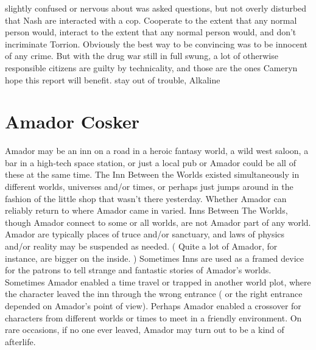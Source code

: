 \documentclass[12pt]{book}
\begin{document}
slightly confused or nervous about was asked questions, but not overly disturbed that Nash are interacted with a cop. Cooperate to the extent that any normal person would, interact to the extent that any normal person would, and don't incriminate Torrion. Obviously the best way to be convincing was to be innocent of any crime. But with the drug war still in full swung, a lot of otherwise responsible citizens are guilty by technicality, and those are the ones Cameryn hope this report will benefit. stay out of trouble, Alkaline



\chapter{Amador Cosker}

Amador may be an inn on a road in a heroic fantasy world, a wild west saloon, a bar in a high-tech space station, or just a local pub  or Amador could be all of these at the same time. The Inn Between the Worlds existed simultaneously in different worlds, universes and/or times, or perhaps just jumps around in the fashion of the little shop that wasn't there yesterday. Whether Amador can reliably return to where Amador came in varied. Inns Between The Worlds, though Amador connect to some or all worlds, are not Amador part of any world. Amador are typically places of truce and/or sanctuary, and laws of physics and/or reality may be suspended as needed. ( Quite a lot of Amador, for instance, are bigger on the inside. ) Sometimes Inns are used as a framed device for the patrons to tell strange and fantastic stories of Amador's worlds. Sometimes Amador enabled a time travel or trapped in another world plot, where the character leaved the inn through the wrong entrance ( or the right entrance depended on Amador's point of view). Perhaps Amador enabled a crossover for characters from different worlds or times to meet in a friendly environment. On rare occasions, if no one ever leaved, Amador may turn out to be a kind of afterlife.
\end{document}
